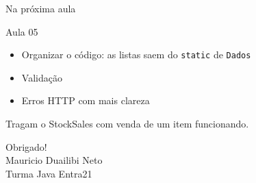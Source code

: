\documentclass[aspectratio=169,11pt]{beamer}
\begin{document}
\begin{frame}{Na próxima aula}
  \begin{block}{Aula 05}
    \begin{itemize}
      \item Organizar o código: as listas saem do
            \texttt{static} de \texttt{Dados}
      \item Validação
      \item Erros HTTP com mais clareza
    \end{itemize}
  \end{block}

  \vspace{0.6em}
  Tragam o StockSales com venda de um item funcionando.
\end{frame}

\begin{frame}
  \begin{center}
    \Huge Obrigado!\\[1.2em]
    \normalsize Mauricio Duailibi Neto\\
    Turma Java Entra21
  \end{center}
\end{frame}
\end{document}
